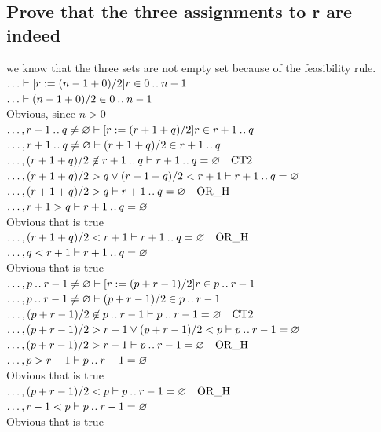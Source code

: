 \documentclass[11pt,a4paper,fleqn]{article}
\begin{document}
\subsection{ Prove that the three assignments to r are indeed }
\noindent
we know that the three sets are not empty set because of the feasibility rule.\\
$\ldots\vdash [r:=(n-1+0)/2]r\in 0\mathbin{.\mkern1mu.} n-1$\\
$\ldots\vdash (n-1+0)/2\in 0\mathbin{.\mkern1mu.} n-1$\\
Obvious, since $n>0$\\
$\ldots,r+1\mathbin{.\mkern1mu.} q\not=\mathord\varnothing\vdash [r:=(r+1+q)/2]r\in r+1\mathbin{.\mkern1mu.} q$\\
$\ldots,r+1\mathbin{.\mkern1mu.} q\not=\mathord\varnothing\vdash (r+1+q)/2\in r+1\mathbin{.\mkern1mu.} q$\\
$\ldots,(r+1+q)/2\not\in r+1\mathbin{.\mkern1mu.} q\vdash r+1\mathbin{.\mkern1mu.} q=\mathord\varnothing\quad\text{CT2}$\\
$\ldots,(r+1+q)/2> q \lor (r+1+q)/2< r+1\vdash r+1\mathbin{.\mkern1mu.} q=\mathord\varnothing$\\
$\ldots,(r+1+q)/2> q \vdash r+1\mathbin{.\mkern1mu.} q=\mathord\varnothing\quad\text{OR\_H}$\\
$\ldots,r+1>q \vdash r+1\mathbin{.\mkern1mu.} q=\mathord\varnothing$\\
Obvious that is true\\
$\ldots,(r+1+q)/2< r+1 \vdash r+1\mathbin{.\mkern1mu.} q=\mathord\varnothing\quad\text{OR\_H}$\\
$\ldots,q<r+1 \vdash r+1\mathbin{.\mkern1mu.} q=\mathord\varnothing$\\
Obvious that is true\\
$\ldots,p\mathbin{.\mkern1mu.} r-1\not=\mathord\varnothing\vdash [r:=(p+r-1)/2]r\in p\mathbin{.\mkern1mu.} r-1$\\
$\ldots,p\mathbin{.\mkern1mu.} r-1\not=\mathord\varnothing\vdash (p+r-1)/2\in p\mathbin{.\mkern1mu.} r-1$\\
$\ldots,(p+r-1)/2\not\in p\mathbin{.\mkern1mu.} r-1\vdash p\mathbin{.\mkern1mu.} r-1=\mathord\varnothing\quad\text{CT2}$\\
$\ldots,(p+r-1)/2> r-1 \lor (p+r-1)/2< p\vdash p\mathbin{.\mkern1mu.} r-1=\mathord\varnothing$\\
$\ldots,(p+r-1)/2> r-1 \vdash p\mathbin{.\mkern1mu.} r-1=\mathord\varnothing\quad\text{OR\_H}$\\
$\ldots,p>r-1 \vdash p\mathbin{.\mkern1mu.} r-1=\mathord\varnothing$\\
Obvious that is true\\
$\ldots,(p+r-1)/2< p \vdash p\mathbin{.\mkern1mu.} r-1=\mathord\varnothing\quad\text{OR\_H}$\\
$\ldots,r-1<p \vdash p\mathbin{.\mkern1mu.} r-1=\mathord\varnothing$\\
Obvious that is true\\
\end{document}
